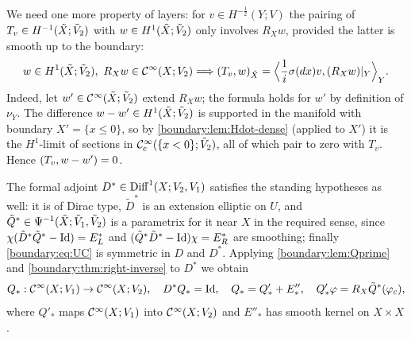 We need one more property of layers: for $v\in H^{-\frac12}(Y;V)$ the pairing of
$T_v\in H^{-1}(\tilde{X};\tilde V_2)$ with $w\in H^1(\tilde{X};\tilde V_2)$ only involves $R_Xw$,
provided the latter is smooth up to the boundary:
\begin{equation}\label{boundary:eq:layer-pairing}
w\in H^1(\Xt;\tilde V_2),\ R_Xw\in\CI(X;V_2)\Longrightarrow\inner{T_v}{w}_{\Xt}=
\Big\langle\frac1i\sigma(dx)v,(R_Xw)|_Y\Big\rangle_Y.
\end{equation}
Indeed, let $w'\in\mathcal{C}^\infty(\tilde{X};\tilde V_2)$ extend $R_Xw$; the formula holds for $w'$ by
definition of $\nu_Y$. The difference $w-w'\in H^1(\tilde{X};\tilde V_2)$ is supported in the
manifold with boundary $X'=\{x\le0\}$, so by \cref{boundary:lem:Hdot-dense} (applied to
$X'$) it is the $H^1$-limit of sections in $\mathcal{C}^\infty_{\mathrm{c}}(\{x<0\};\tilde V_2)$, all of which
pair to zero with $T_v$. Hence $( T_v, w-w')=0$.

The formal adjoint $D^*\in\operatorname{Diff}^{1}(X;V_2,V_1)$ satisfies the standing hypotheses as well:
it is of Dirac type, $\tilde D^*$ is an extension elliptic on $U$, and $\tilde Q^*\in
\Psi^{-1}(\tilde{X};\tilde V_1,\tilde V_2)$ is a parametrix for it near $X$ in the required
sense, since $\chi(\tilde D^*\tilde Q^*-\operatorname{Id})=E_L^*$ and $(\tilde Q^*\tilde D^*-\operatorname{Id})\chi=
E_R^*$ are smoothing; finally \eqref{boundary:eq:UC} is symmetric in $D$ and $D^*$.
Applying \cref{boundary:lem:Qprime} and \cref{boundary:thm:right-inverse} to $D^*$ we
obtain
\begin{equation}\label{boundary:eq:Qstar}
Q_*:\mathcal{C}^\infty(X;V_1)\to\mathcal{C}^\infty(X;V_2),\quad D^*Q_*=\operatorname{Id},\quad Q_*=Q'_*+E''_*,\quad Q'_*\varphi=
R_X\tilde Q^*(\varphi_c),
\end{equation}
where $Q'_*$ maps $\mathcal{C}^\infty(X;V_1)$ into $\mathcal{C}^\infty(X;V_2)$ and $E''_*$ has smooth kernel on
$X\times X$.

